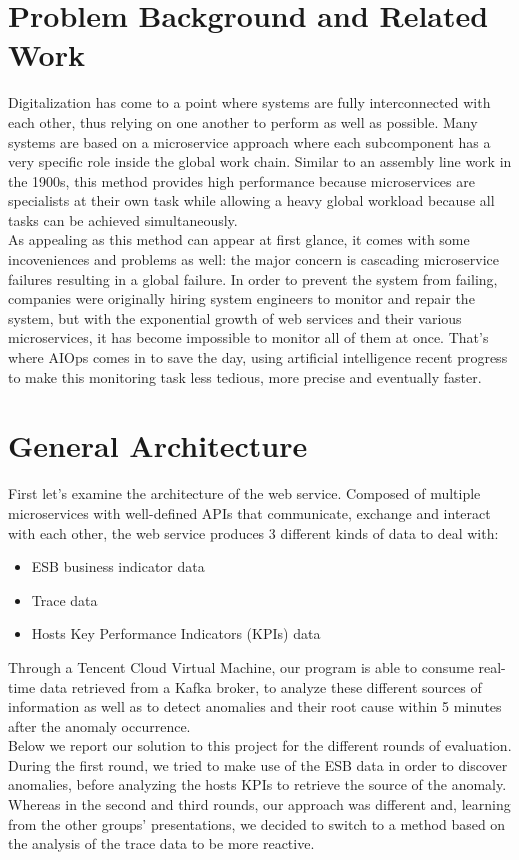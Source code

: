 \documentclass[acmsmall, screen, nonacm]{acmart}
\begin{document}
\section{Problem Background and Related Work}
Digitalization has come to a point where systems are fully interconnected with each other, thus relying on one another to perform as well as possible. 
Many systems are based on a microservice approach where each subcomponent has a very specific role inside the global work chain. 
Similar to an assembly line work in the 1900s, this method provides high performance because microservices are specialists at their own task while allowing a heavy global workload because all tasks can be achieved simultaneously.
\\
As appealing as this method can appear at first glance, it comes with some incoveniences and problems as well: the major concern is cascading microservice failures resulting in a global failure. 
In order to prevent the system from failing, companies were originally hiring system engineers to monitor and repair the system, but with the exponential growth of web services and their various microservices, it has become impossible to monitor all of them at once. 
That's where AIOps comes in to save the day, using artificial intelligence recent progress to make this monitoring task less tedious, more precise and eventually faster.
\\


\section{General Architecture}
First let's examine the architecture of the web service. 
Composed of multiple microservices with well-defined APIs that communicate, exchange and interact with each other, the web service produces 3 different kinds of data to deal with:
\begin{itemize}
  \item ESB business indicator data
  \item Trace data
  \item Hosts Key Performance Indicators (KPIs) data 
\end{itemize}
Through a Tencent Cloud Virtual Machine, our program is able to consume real-time data retrieved from a Kafka broker, to analyze these different sources of information as well as to detect anomalies and their root cause within 5 minutes after the anomaly occurrence. 
\\
Below we report our solution to this project for the different rounds of evaluation. 
During the first round, we tried to make use of the ESB data in order to discover anomalies, before analyzing the hosts KPIs to retrieve the source of the anomaly. 
Whereas in the second and third rounds, our approach was different and, learning from the other groups' presentations, we decided to switch to a method based on the analysis of the trace data to be more reactive. 
   
\end{document}
